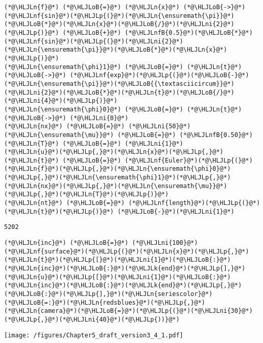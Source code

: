 \documentclass[12pt,landscape]{article}
\newcommand{\HLJLk}[1]{\textcolor[RGB]{148,91,176}{\textbf{#1}}}
\newcommand{\HLJLn}[1]{#1}
\newcommand{\HLJLnf}[1]{\textcolor[RGB]{66,102,213}{#1}}
\newcommand{\HLJLnfB}[1]{\textcolor[RGB]{59,151,46}{#1}}
\newcommand{\HLJLni}[1]{\textcolor[RGB]{59,151,46}{#1}}
\newcommand{\HLJLoB}[1]{\textcolor[RGB]{102,102,102}{\textbf{#1}}}
\newcommand{\HLJLp}[1]{#1}
\begin{document}
{\begin{lstlisting}
(*@\HLJLn{f}@*) (*@\HLJLoB{=}@*) (*@\HLJLn{x}@*) (*@\HLJLoB{->}@*) (*@\HLJLnf{sin}@*)(*@\HLJLp{(}@*)(*@\HLJLn{\ensuremath{\pi}}@*)(*@\HLJLoB{*}@*)(*@\HLJLn{x}@*)(*@\HLJLoB{/}@*)(*@\HLJLni{2}@*)(*@\HLJLp{)}@*) (*@\HLJLoB{+}@*) (*@\HLJLnfB{0.5}@*)(*@\HLJLoB{*}@*)(*@\HLJLnf{sin}@*)(*@\HLJLp{(}@*)(*@\HLJLni{2}@*)(*@\HLJLn{\ensuremath{\pi}}@*)(*@\HLJLoB{*}@*)(*@\HLJLn{x}@*)(*@\HLJLp{)}@*)
(*@\HLJLn{\ensuremath{\phi}1}@*) (*@\HLJLoB{=}@*) (*@\HLJLn{t}@*) (*@\HLJLoB{->}@*) (*@\HLJLnf{exp}@*)(*@\HLJLp{(}@*)(*@\HLJLoB{-}@*)(*@\HLJLn{\ensuremath{\pi}}@*)(*@\HLJLoB{{\textasciicircum}}@*)(*@\HLJLni{2}@*)(*@\HLJLoB{*}@*)(*@\HLJLn{t}@*)(*@\HLJLoB{/}@*)(*@\HLJLni{4}@*)(*@\HLJLp{)}@*)
(*@\HLJLn{\ensuremath{\phi}0}@*) (*@\HLJLoB{=}@*) (*@\HLJLn{t}@*) (*@\HLJLoB{->}@*) (*@\HLJLni{0}@*)
(*@\HLJLn{nx}@*) (*@\HLJLoB{=}@*) (*@\HLJLni{50}@*)
(*@\HLJLn{\ensuremath{\mu}}@*) (*@\HLJLoB{=}@*) (*@\HLJLnfB{0.50}@*)
(*@\HLJLn{T}@*) (*@\HLJLoB{=}@*) (*@\HLJLni{1}@*)
(*@\HLJLn{u}@*)(*@\HLJLp{,}@*)(*@\HLJLn{x}@*)(*@\HLJLp{,}@*)(*@\HLJLn{t}@*) (*@\HLJLoB{=}@*) (*@\HLJLnf{Euler}@*)(*@\HLJLp{(}@*)(*@\HLJLn{f}@*)(*@\HLJLp{,}@*)(*@\HLJLn{\ensuremath{\phi}0}@*)(*@\HLJLp{,}@*)(*@\HLJLn{\ensuremath{\phi}1}@*)(*@\HLJLp{,}@*)(*@\HLJLn{nx}@*)(*@\HLJLp{,}@*)(*@\HLJLn{\ensuremath{\mu}}@*)(*@\HLJLp{,}@*)(*@\HLJLn{T}@*)(*@\HLJLp{)}@*)
(*@\HLJLn{nt}@*) (*@\HLJLoB{=}@*) (*@\HLJLnf{length}@*)(*@\HLJLp{(}@*)(*@\HLJLn{t}@*)(*@\HLJLp{)}@*) (*@\HLJLoB{-}@*)(*@\HLJLni{1}@*)
\end{lstlisting}

\begin{lstlisting}
5202
\end{lstlisting}


\begin{lstlisting}
(*@\HLJLn{inc}@*) (*@\HLJLoB{=}@*) (*@\HLJLni{100}@*)
(*@\HLJLnf{surface}@*)(*@\HLJLp{(}@*)(*@\HLJLn{x}@*)(*@\HLJLp{,}@*)(*@\HLJLn{t}@*)(*@\HLJLp{[}@*)(*@\HLJLni{1}@*)(*@\HLJLoB{:}@*)(*@\HLJLn{inc}@*)(*@\HLJLoB{:}@*)(*@\HLJLk{end}@*)(*@\HLJLp{],}@*)(*@\HLJLn{u}@*)(*@\HLJLp{[}@*)(*@\HLJLni{1}@*)(*@\HLJLoB{:}@*)(*@\HLJLn{inc}@*)(*@\HLJLoB{:}@*)(*@\HLJLk{end}@*)(*@\HLJLp{,}@*)(*@\HLJLoB{:}@*)(*@\HLJLp{],}@*)(*@\HLJLn{seriescolor}@*)(*@\HLJLoB{=:}@*)(*@\HLJLn{redsblues}@*)(*@\HLJLp{,}@*) (*@\HLJLn{camera}@*)(*@\HLJLoB{=}@*)(*@\HLJLp{(}@*)(*@\HLJLni{30}@*)(*@\HLJLp{,}@*)(*@\HLJLni{40}@*)(*@\HLJLp{))}@*)
\end{lstlisting}

\texttt{[image: /figures/Chapter5\_draft\_version3\_4\_1.pdf]}

}
\end{document}
